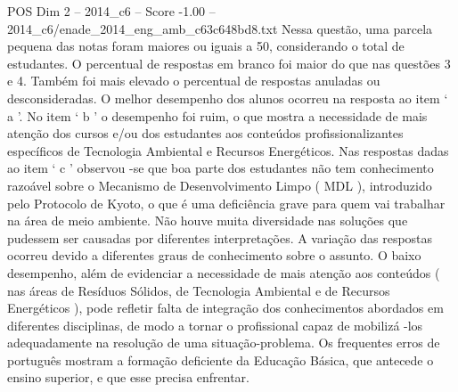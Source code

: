 \begin{textsample}{POS Dim 2 – 2014\_c6 – Score -1.00 – 2014\_c6/enade\_2014\_eng\_amb\_c63c648bd8.txt}
Nessa questão, uma parcela pequena das notas foram maiores ou iguais a 50, considerando o total de estudantes.
O percentual de respostas em branco foi maior do que nas questões 3 e 4.
Também foi mais elevado o percentual de respostas anuladas ou desconsideradas.
O melhor desempenho dos alunos ocorreu na resposta ao item ‘ a ’.
No item ‘ b ’ o desempenho foi ruim, o que mostra a necessidade de mais atenção dos cursos e/ou dos estudantes aos conteúdos profissionalizantes específicos de Tecnologia Ambiental e Recursos Energéticos.
Nas respostas dadas ao item ‘ c ’ observou -se que boa parte dos estudantes não tem conhecimento razoável sobre o Mecanismo de Desenvolvimento Limpo ( MDL ), introduzido pelo Protocolo de Kyoto, o que é uma deficiência grave para quem vai trabalhar na área de meio ambiente.
Não houve muita diversidade nas soluções que pudessem ser causadas por diferentes interpretações.
A variação das respostas ocorreu devido a diferentes graus de conhecimento sobre o assunto.
O baixo desempenho, além de evidenciar a necessidade de mais atenção aos conteúdos ( nas áreas de Resíduos Sólidos, de Tecnologia Ambiental e de Recursos Energéticos ), pode refletir falta de integração dos conhecimentos abordados em diferentes disciplinas, de modo a tornar o profissional capaz de mobilizá -los adequadamente na resolução de uma situação-problema.
Os frequentes erros de português mostram a formação deficiente da Educação Básica, que antecede o ensino superior, e que esse precisa enfrentar.

\end{textsample}
